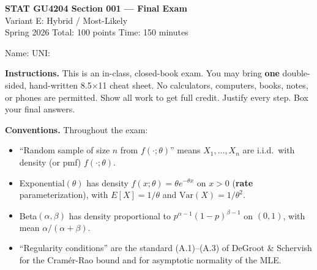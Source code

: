 \documentclass[11pt]{article}
\begin{document}
\begin{center}
{\LARGE\bfseries STAT GU4204 Section 001 --- Final Exam}\\[4pt]
{\large Variant E: Hybrid / Most-Likely}\\[6pt]
{\large Spring 2026 \hspace{1.5cm} Total: 100 points \hspace{1.5cm} Time: 150 minutes}\\[4pt]
\end{center}

\medskip

Name: \underline{\hspace{3in}} \hspace{1cm} UNI: \underline{\hspace{1.5in}}

\medskip

\textbf{Instructions.} This is an in-class, closed-book exam. You may bring \textbf{one} double-sided, hand-written 8.5$\times$11 cheat sheet. No calculators, computers, books, notes, or phones are permitted. Show all work to get full credit. Justify every step. Box your final answers.

\medskip

\textbf{Conventions.} Throughout the exam:
\begin{itemize}[leftmargin=2em,nosep]
    \item ``Random sample of size $n$ from $f(\cdot;\theta)$'' means $X_1,\ldots,X_n$ are i.i.d.\ with density (or pmf) $f(\cdot;\theta)$.
    \item Exponential$(\theta)$ has density $f(x;\theta) = \theta e^{-\theta x}$ on $x>0$ (\textbf{rate} parameterization), with $E[X]=1/\theta$ and $\mathrm{Var}(X)=1/\theta^2$.
    \item Beta$(\alpha,\beta)$ has density proportional to $p^{\alpha-1}(1-p)^{\beta-1}$ on $(0,1)$, with mean $\alpha/(\alpha+\beta)$.
    \item ``Regularity conditions'' are the standard (A.1)--(A.3) of DeGroot \& Schervish for the Cram\'er-Rao bound and for asymptotic normality of the MLE.
\end{itemize}

\medskip
\end{document}
